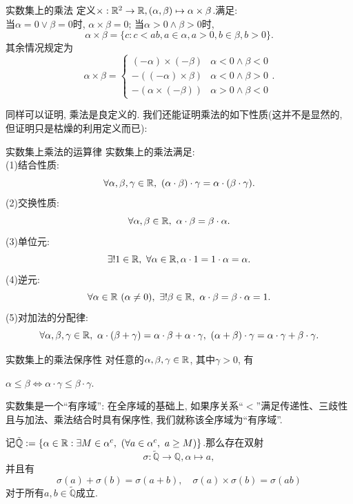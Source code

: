 \begin{definition}{实数集上的乘法}
	定义$\times : \mathbb{R} ^2 \to \mathbb{R} , (\alpha , \beta) \mapsto \alpha \times \beta$.满足:  \\
	当$\alpha = 0 \vee \beta = 0$时, $\alpha \times \beta =0$; 当$\alpha >0 \wedge \beta >0$时, $$\alpha \times \beta = \{ c: c<ab, a \in \alpha , a>0, b \in \beta , b>0 \}.$$
	其余情况规定为$$\alpha \times \beta = \begin{cases}
		(-\alpha) \times (-\beta)  & \alpha < 0 \wedge \beta < 0 \\
		-((-\alpha) \times \beta)  & \alpha < 0 \wedge \beta > 0 \\
		-(\alpha \times (-\beta))  & \alpha > 0 \wedge \beta < 0
	\end{cases}.$$
\end{definition}

同样可以证明, 乘法是良定义的. 我们还能证明乘法的如下性质(这并不是显然的, 但证明只是枯燥的利用定义而已): 

\begin{proposition}{实数集上乘法的运算律}
	实数集上的乘法满足:  \\
	(1)结合性质: $$\forall \alpha , \beta , \gamma \in \mathbb{R} , ~(\alpha \cdot \beta ) \cdot \gamma = \alpha \cdot (\beta \cdot \gamma).$$
	(2)交换性质: $$\forall \alpha , \beta \in \mathbb{R}, ~\alpha \cdot \beta = \beta \cdot \alpha .$$
	(3)单位元: $$\exists ! 1 \in \mathbb{R} , ~\forall \alpha \in \mathbb{R} ,  \alpha \cdot 1 = 1 \cdot \alpha = \alpha .$$
	(4)逆元: $$\forall \alpha \in \mathbb{R}~(\alpha \neq 0) , ~\exists ! \beta \in \mathbb{R} , ~\alpha \cdot \beta = \beta \cdot \alpha = 1.$$
	(5)对加法的分配律: $$\forall \alpha , \beta , \gamma \in \mathbb{R} , ~\alpha \cdot (\beta + \gamma) = \alpha \cdot \beta + \alpha \cdot \gamma , ~ (\alpha + \beta) \cdot \gamma = \alpha \cdot \gamma + \beta \cdot \gamma . $$
\end{proposition}

\begin{proposition}{实数集上的乘法保序性}
	对任意的$\alpha , \beta , \gamma \in \mathbb{R}$, 其中$\gamma >0$, 有
	\begin{center}
		$\alpha \leq \beta \Leftrightarrow \alpha \cdot \gamma \leq \beta \cdot \gamma .$
	\end{center}
\end{proposition}

实数集是一个“有序域”: 在全序域的基础上, 如果序关系“$<$”满足传递性、三歧性且与加法、乘法结合时具有保序性, 我们就称该全序域为“有序域”. 

\begin{proposition}{}
	记$\tilde{\mathbb{Q}}: =\{ \alpha \in \mathbb{R} :  \exists M \in \alpha ^c, ~(\forall a \in \alpha ^c, ~a \geq M) \}$.那么存在双射$$\sigma : \tilde{\mathbb{Q}} \to \mathbb{Q}, \alpha \mapsto a, $$
	并且有$$\sigma (a) + \sigma (b) = \sigma (a + b), \quad \sigma (a) \times \sigma (b) = \sigma (a  b)$$
	对于所有$a , b \in \tilde{\mathbb{Q}}$成立.
\end{proposition}

